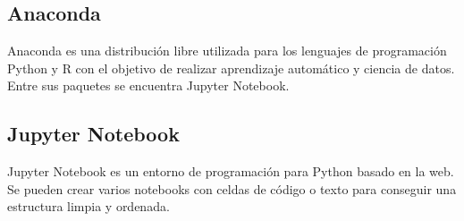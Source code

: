 \subsection{Anaconda}
Anaconda es una distribución libre utilizada para los lenguajes de programación Python y R con el objetivo de realizar aprendizaje automático y ciencia de datos. Entre sus paquetes se encuentra Jupyter Notebook.

\subsection{Jupyter Notebook}
Jupyter Notebook es un entorno de programación para Python basado en la web. Se pueden crear varios notebooks con celdas de código o texto para conseguir una estructura limpia y ordenada.





